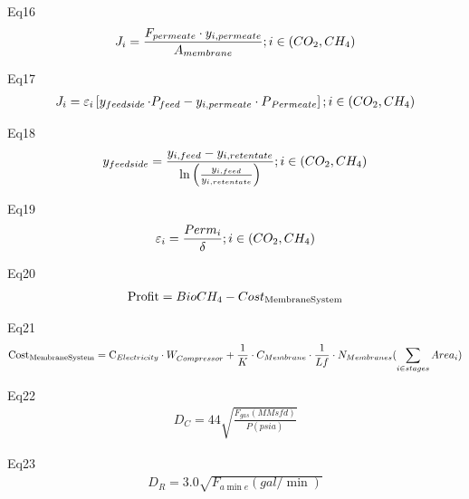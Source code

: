 \documentclass[10pt,a4paper]{article}
\begin{document}
Eq16
\begin{align}
	{J_i} = \frac{{{F_{permeate}}\cdot{y_{i,permeate}}}}{{{A_{membrane}}}};{\rm{ }}i \in (C{O_2},{\rm{ }}C{H_4})
\end{align}

Eq17
\begin{align}
	{J_i} = {\varepsilon _i}\left[ {\mathop {{y_{feedside}}}\limits^{} \cdot{P_{feed}} - {y_{i,permeate}}\cdot P{}_{Permeate}} \right];{\rm{ }}i \in (C{O_2},{\rm{ }}C{H_4})
\end{align}

Eq18
\begin{align}
	\mathop {{y_{feedside}}}\limits^{}  = \frac{{{y_{i,feed}} - {y_{i,retentate}}}}{{\ln \left( {\frac{{{y_{i,feed}}}}{{{y_{i,retentate}}}}} \right)}};{\rm{ }}i \in (C{O_2},{\rm{ }}C{H_4})
\end{align}

Eq19
\begin{align}
	{\varepsilon _i} = \frac{{Per{m_i}}}{\delta };{\rm{ }}i \in (C{O_2},{\rm{ }}C{H_4})
\end{align}

Eq20
\begin{align}
	{\rm{Profit}} = BioC{H_4} - Cos{t_{{\rm{Membrane System}}}}
\end{align}

Eq21
\begin{align}
	{\rm{Cos}}{{\rm{t}}_{{\rm{Membrane System}}}} = {{\rm{C}}_{Electricity{\rm{ }}}}\cdot W_{Compressor}^{} + \frac{1}{K}\cdot{C_{Membrane}}\cdot\frac{1}{{Lf}}\cdot{N_{Membranes}}(\sum\limits_{i \in stages} {Are{a_i}} )
\end{align}

Eq22
\begin{align}
	{D_C} = 44\sqrt {\frac{{{F_{gas}}(MMsfd)}}{{P(psia)}}}
\end{align}

Eq23
\begin{align}
	{D_R} = 3.0\sqrt {{F_{a\min e}}(gal/\min )}
\end{align}

%	
%
%	
%
%	
%
%	
%
%	
%
%	
%
%	
\end{document}
